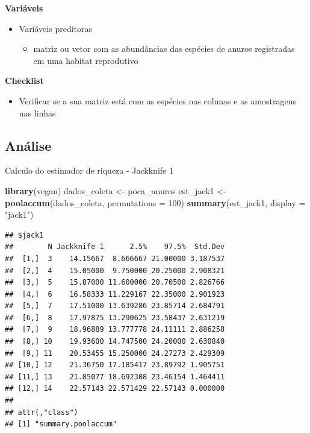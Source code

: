 \documentclass[
]{book}
\newenvironment{Shaded}{\begin{snugshade}}{\end{snugshade}}
\newcommand{\DataTypeTok}[1]{\textcolor[rgb]{0.13,0.29,0.53}{#1}}
\newcommand{\DecValTok}[1]{\textcolor[rgb]{0.00,0.00,0.81}{#1}}
\newcommand{\KeywordTok}[1]{\textcolor[rgb]{0.13,0.29,0.53}{\textbf{#1}}}
\newcommand{\NormalTok}[1]{#1}
\newcommand{\StringTok}[1]{\textcolor[rgb]{0.31,0.60,0.02}{#1}}
\providecommand{\tightlist}{%
  \setlength{\itemsep}{0pt}\setlength{\parskip}{0pt}}
\begin{document}
\textbf{Variáveis}

\begin{itemize}
\tightlist
\item
  Variáveis preditoras

  \begin{itemize}
  \tightlist
  \item
    matriz ou vetor com as abundâncias das espécies de anuros registradas em uma habitat reprodutivo
  \end{itemize}
\end{itemize}

\textbf{Checklist}

\begin{itemize}
\tightlist
\item
  Verificar se a sua matriz está com as espécies nas colunas e as amostragens nas linhas
\end{itemize}

\hypertarget{anuxe1lise-5}{%
\subsection{Análise}\label{anuxe1lise-5}}

Calculo do estimador de riqueza - Jackknife 1

\begin{Shaded}
\begin{Highlighting}[]
\KeywordTok{library}\NormalTok{(vegan)}
\NormalTok{dados_coleta <-}\StringTok{ }\NormalTok{poca_anuros}
\NormalTok{est_jack1 <-}\StringTok{ }\KeywordTok{poolaccum}\NormalTok{(dados_coleta, }\DataTypeTok{permutations =} \DecValTok{100}\NormalTok{)}
\KeywordTok{summary}\NormalTok{(est_jack1, }\DataTypeTok{display =} \StringTok{"jack1"}\NormalTok{)}
\end{Highlighting}
\end{Shaded}

\begin{verbatim}
## $jack1
##        N Jackknife 1      2.5%    97.5%  Std.Dev
##  [1,]  3    14.15667  8.666667 21.00000 3.187537
##  [2,]  4    15.05000  9.750000 20.25000 2.908321
##  [3,]  5    15.87000 11.600000 20.70500 2.826766
##  [4,]  6    16.58333 11.229167 22.35000 2.901923
##  [5,]  7    17.51000 13.639286 23.85714 2.684791
##  [6,]  8    17.97875 13.290625 23.58437 2.631219
##  [7,]  9    18.96889 13.777778 24.11111 2.886258
##  [8,] 10    19.93600 14.747500 24.20000 2.630840
##  [9,] 11    20.53455 15.250000 24.27273 2.429309
## [10,] 12    21.36750 17.185417 23.89792 1.905751
## [11,] 13    21.85077 18.692308 23.46154 1.464411
## [12,] 14    22.57143 22.571429 22.57143 0.000000
## 
## attr(,"class")
## [1] "summary.poolaccum"
\end{verbatim}
\end{document}
